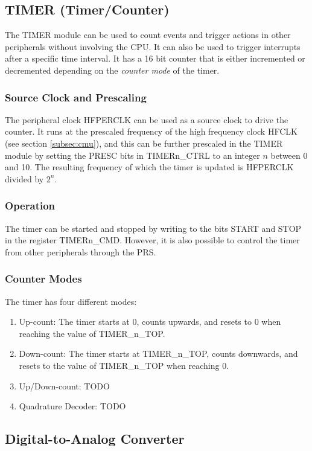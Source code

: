 \subsection{TIMER (Timer/Counter)}
The TIMER module can be used to count events and trigger actions in other peripherals without involving the CPU. It can also be used to trigger interrupts after a specific time interval. It has a 16 bit counter that is either incremented or decremented depending on the \emph{counter mode} of the timer.

\subsubsection{Source Clock and Prescaling} The peripheral clock HFPERCLK can be used as a source clock to drive the counter. It runs at the prescaled frequency of the high frequency clock HFCLK (see section \ref{subsec:cmu}), and this can be further prescaled in the TIMER module by setting the PRESC bits in TIMERn\_CTRL to an integer $n$ between 0 and 10. The resulting frequency of which the timer is updated is HFPERCLK divided by $2^{n}$.

\subsubsection{Operation}
The timer can be started and stopped by writing to the bits START and STOP in the register TIMERn\_CMD. However, it is also possible to control the timer from other peripherals through the PRS.

\subsubsection{Counter Modes}
The timer has four different modes:
\begin{enumerate}
	\item Up-count: The timer starts at 0, counts upwards, and resets to 0 when reaching the value of TIMER\_n\_TOP.
	\item Down-count: The timer starts at TIMER\_n\_TOP, counts downwards, and resets to the value of TIMER\_n\_TOP when reaching 0.

	\item Up/Down-count: TODO %
	\item Quadrature Decoder: TODO %
\end{enumerate}


\subsection{Digital-to-Analog Converter}

